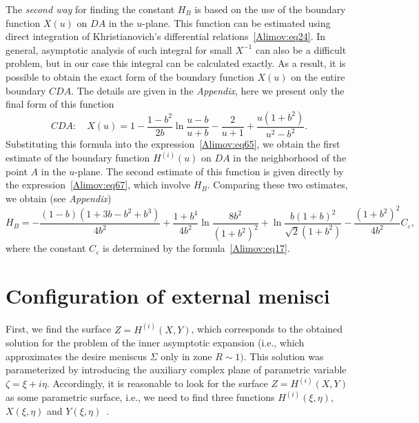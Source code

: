 \documentclass[
11pt,%
tightenlines,%
twoside,%
onecolumn,%
nofloats,%
nobibnotes,%
nofootinbib,%
superscriptaddress,%
noshowpacs,%
centertags]%
{revtex4-2}
\begin{document}
The \textit{second way} for finding the constant $H_B $ is based on the use of the boundary
function $X(u)$ on $DA$ in the $u$-plane. This function can be estimated using direct integration
of Khristianovich's differential relations~\eqref{Alimov:eq24}. In general, asymptotic analysis of
such integral for small $X^{-1}$ can also be a difficult problem, but in our case this integral can
be calculated exactly. As a result, it is possible to obtain the exact form of the boundary
function $X(u)$ on the entire boundary $CDA$. The details are given in the \textit{Appendix}, here
we present only the final form of this function
\begin{equation}
\label{Alimov:eq68} CDA: \quad X(u) = 1 - \frac{1 - b^2}{2b}\ln \frac{u - b}{u + b} - \frac{2}{u +
1} + \frac{u(1 + b^2)}{u^2 - b^2}.
\end{equation}
Substituting this formula into the expression~\eqref{Alimov:eq65}, we obtain the first estimate of
the boundary function $H^{(i)}(u)$ on $DA$ in the neighborhood of the point $A$ in the $u$-plane.
The second estimate of this function is given directly by the expression~\eqref{Alimov:eq67}, which
involve $H_B$. Comparing these two estimates, we obtain (see \textit{Appendix})
\begin{equation}
\label{Alimov:eq69} H_B = - \frac{(1 - b)(1 + 3b - b^2 + b^3)}{4b^2} + \frac{1 + b^4}{4b^2}\ln
\frac{8b^2}{(1 + b^2)^2} + \ln \frac{b(1 + b)^2}{\sqrt 2 (1 + b^2)} - \frac{(1 +
b^2)^2}{4b^2}C_\varepsilon,
\end{equation}
where the constant $C_\varepsilon$ is determined by the formula~\eqref{Alimov:eq17}.

\section{Configuration of external menisci} \label{Alimov:sec7}
First, we find the surface $Z = H^{(i)}(X,Y)$, which corresponds to the obtained solution for the
problem of the inner asymptotic expansion (i.e., which approximates the desire meniscus $\Sigma $
only in zone $R \sim 1)$. This solution was parameterized by introducing the auxiliary complex
plane of parametric variable $\zeta = \xi + i\eta $. Accordingly, it is reasonable to look for the
surface $Z = H^{(i)}(X,Y)$ as some parametric surface, i.e., we need to find three functions
$H^{(i)}(\xi, \eta)$, $X(\xi, \eta)$ and $Y(\xi,\eta)$~\cite{Alimov:bib11}.
\end{document}
